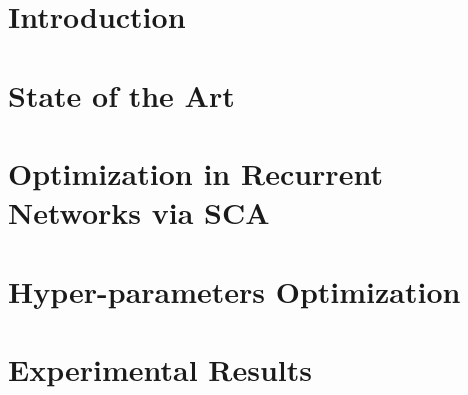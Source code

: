 \documentclass[12pt]{report}
\begin{document}
\tableofcontents

\chapter{Introduction}

\chapter{State of the Art}

\chapter{Optimization in Recurrent Networks via SCA}

\chapter{Hyper-parameters Optimization}

\chapter{Experimental Results}

\end{document}
